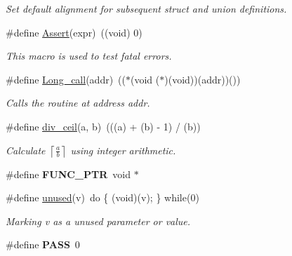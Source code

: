 \begin{DoxyCompactItemize}
\begin{DoxyCompactList}\small\item\em Set default alignment for subsequent struct and union definitions. \end{DoxyCompactList}\item 
\#define \hyperlink{group__group__sam0__utils_gaab1e54dcc40192f9704e8b252635450f}{Assert}(expr)~((void) 0)
\begin{DoxyCompactList}\small\item\em This macro is used to test fatal errors. \end{DoxyCompactList}\item 
\#define \hyperlink{group__group__sam0__utils_ga5b759626f343cc1af9159cc02b763837}{Long\+\_\+call}(addr)~(($\ast$(void ($\ast$)(void))(addr))())
\begin{DoxyCompactList}\small\item\em Calls the routine at address {\itshape addr}. \end{DoxyCompactList}\item 
\#define \hyperlink{group__group__sam0__utils_ga6d4ebd841bc96041a7f3a61e227c1fb2}{div\+\_\+ceil}(a,  b)~(((a) + (b) -\/ 1) / (b))
\begin{DoxyCompactList}\small\item\em Calculate $ \left\lceil \frac{a}{b} \right\rceil $ using integer arithmetic. \end{DoxyCompactList}\item 
\hypertarget{group__group__sam0__utils_gacce64924b686dd08a83042b35d0d1480}{}\#define {\bfseries F\+U\+N\+C\+\_\+\+P\+T\+R}~void $\ast$\label{group__group__sam0__utils_gacce64924b686dd08a83042b35d0d1480}

\item 
\hypertarget{group__group__sam0__utils_ga417dba7f63dde98dbebd6336d8af9d91}{}\#define \hyperlink{group__group__sam0__utils_ga417dba7f63dde98dbebd6336d8af9d91}{unused}(v)~do \{ (void)(v); \} while(0)\label{group__group__sam0__utils_ga417dba7f63dde98dbebd6336d8af9d91}

\begin{DoxyCompactList}\small\item\em Marking {\itshape v} as a unused parameter or value. \end{DoxyCompactList}\item 
\hypertarget{group__group__sam0__utils_gaba5c54fadff8d880b1945dde87496e31}{}\#define {\bfseries P\+A\+S\+S}~0\label{group__group__sam0__utils_gaba5c54fadff8d880b1945dde87496e31}


\end{DoxyCompactItemize}
